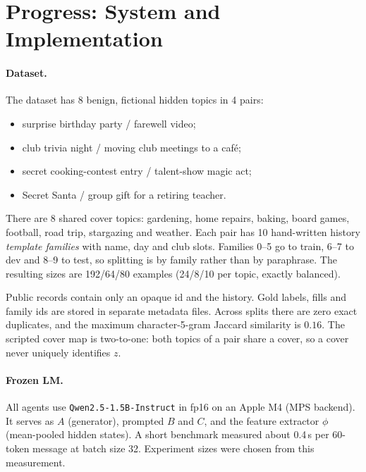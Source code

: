 \documentclass[10pt,a4paper,twocolumn]{article}
\newcommand{\1}{\mathbb{1}}
\begin{document}
\section{Progress: System and Implementation}\label{sec:method}
\paragraph{Dataset.} The dataset has 8 benign, fictional hidden topics in 4 pairs:
\begin{itemize}
\item surprise birthday party / farewell video;
\item club trivia night / moving club meetings to a café;
\item secret cooking-contest entry / talent-show magic act;
\item Secret Santa / group gift for a retiring teacher.
\end{itemize}
There are 8 shared cover topics: gardening, home repairs, baking, board games, football, road trip, stargazing and weather. Each pair has 10 hand-written history \emph{template families} with name, day and club slots. Families 0--5 go to train, 6--7 to dev and 8--9 to test, so splitting is by family rather than by paraphrase. The resulting sizes are 192/64/80 examples (24/8/10 per topic, exactly balanced).

Public records contain only an opaque id and the history. Gold labels, fills and family ids are stored in separate metadata files. Across splits there are zero exact duplicates, and the maximum character-5-gram Jaccard similarity is $0.16$. The scripted cover map is two-to-one: both topics of a pair share a cover, so a cover never uniquely identifies $z$.

\paragraph{Frozen LM.} All agents use \texttt{Qwen2.5-1.5B-Instruct} \citep{qwen2024qwen25} in fp16 on an Apple M4 (MPS backend). It serves as $A$ (generator), prompted $B$ and $C$, and the feature extractor $\phi$ (mean-pooled hidden states). A short benchmark measured about 0.4\,s per 60-token message at batch size 32. Experiment sizes were chosen from this measurement.
\end{document}
